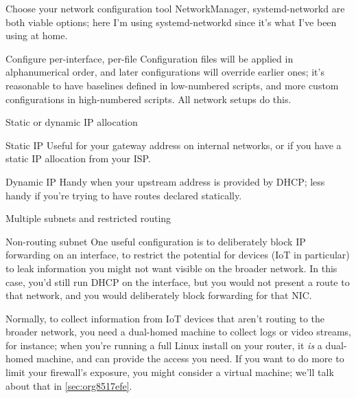 \documentclass[bigger]{beamer}
\begin{document}
\begin{frame}[label={sec:org8d7dd3d}]{Choose your network configuration tool}
NetworkManager, systemd-networkd are both viable options; here I'm using
systemd-networkd since it's what I've been using at home.

\begin{block}{Configure per-interface, per-file}
Configuration files will be applied in alphanumerical order, and later
configurations will override earlier ones; it's reasonable to have
baselines defined in low-numbered scripts, and more custom configurations
in high-numbered scripts. All network setups do this.
\end{block}

\begin{block}{Static or dynamic IP allocation}
\begin{block}{Static IP}
Useful for your gateway address on internal networks, or if you have a
static IP allocation from your ISP.
\end{block}

\begin{block}{Dynamic IP}
Handy when your upstream address is provided by DHCP; less handy if you're
trying to have routes declared statically.
\end{block}
\end{block}
\end{frame}

\begin{frame}[label={sec:org3a006ff}]{Multiple subnets and restricted routing}
\begin{block}{Non-routing subnet}
One useful configuration is to deliberately block IP forwarding on an
interface, to restrict the potential for devices (IoT in particular) to
leak information you might not want visible on the broader network. In this
case, you'd still run DHCP on the interface, but you would not present a
route to that network, and you would deliberately block forwarding for that
NIC.

Normally, to collect information from IoT devices that aren't routing to
the broader network, you need a dual-homed machine to collect logs or video
streams, for instance; when you're running a full Linux install on your
router, it \emph{is} a dual-homed machine, and can provide the access you
need. If you want to do more to limit your firewall's exposure, you might
consider a virtual machine; we'll talk about that in \ref{sec:org8517efe}.
\end{block}
\end{frame}
\end{document}
